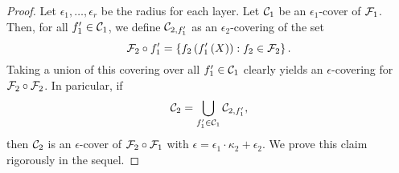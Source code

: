 \begin{proof}
Let $\epsilon_1,\dots,\epsilon_r$ be the radius for each layer. Let $\mathcal C_1$ be an $\epsilon_1$-cover of $\mathcal F_1$. Then, for all $f_1' \in \mathcal C_1$, we define $\mathcal C_{2, f_1'}$ as an $\epsilon_2$-covering of  the set 
\begin{equation}
    \mathcal F_2 \circ f_1' = \left\{f_2\left(f_1'\left(X\right)\right) : f_2 \in \mathcal F_2 \right\}.
\end{equation}
Taking a union of this covering over all $f_1' \in \mathcal C_1$ clearly yields an $\epsilon$-covering for $\mathcal F_2 \circ \mathcal F_2$. In paricular, if 
\begin{align}
    \mathcal C_2 = \bigcup_{f_1'\in \mathcal C_1}\mathcal C_{2,f_1'},
\end{align} 
then $\mathcal C_2$ is an $\epsilon$-cover of $\mathcal F_2 \circ \mathcal F_1$ with $\epsilon = \epsilon_1 \cdot \kappa_2 + \epsilon_2$. We prove this claim rigorously in the sequel.


\end{proof}
